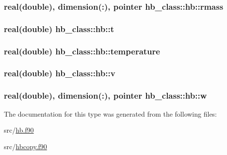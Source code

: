 \hypertarget{structhb__class_1_1hb_adc2ac99589f86766e4d80c7a2d8eaa0c}{
\subsubsection[{rmass}]{\setlength{\rightskip}{0pt plus 5cm}real(double), dimension(\+:), pointer hb\+\_\+class\+::hb\+::rmass\hspace{0.3cm}{\ttfamily [private]}}}\label{structhb__class_1_1hb_adc2ac99589f86766e4d80c7a2d8eaa0c}
\hypertarget{structhb__class_1_1hb_aa9a64f5f6e1c6b43e49f4f369cc36122}{
\subsubsection[{t}]{\setlength{\rightskip}{0pt plus 5cm}real(double) hb\+\_\+class\+::hb\+::t\hspace{0.3cm}{\ttfamily [private]}}}\label{structhb__class_1_1hb_aa9a64f5f6e1c6b43e49f4f369cc36122}
\hypertarget{structhb__class_1_1hb_a5d5e5ee121dffd96571df21b84b83507}{
\subsubsection[{temperature}]{\setlength{\rightskip}{0pt plus 5cm}real(double) hb\+\_\+class\+::hb\+::temperature\hspace{0.3cm}{\ttfamily [private]}}}\label{structhb__class_1_1hb_a5d5e5ee121dffd96571df21b84b83507}
\hypertarget{structhb__class_1_1hb_ac20e5692850cd29066ed51b1f51b65ab}{
\subsubsection[{v}]{\setlength{\rightskip}{0pt plus 5cm}real(double) hb\+\_\+class\+::hb\+::v\hspace{0.3cm}{\ttfamily [private]}}}\label{structhb__class_1_1hb_ac20e5692850cd29066ed51b1f51b65ab}
\hypertarget{structhb__class_1_1hb_aa5b032073db26bbc82430e5dcefa77a6}{
\subsubsection[{w}]{\setlength{\rightskip}{0pt plus 5cm}real(double), dimension(\+:), pointer hb\+\_\+class\+::hb\+::w\hspace{0.3cm}{\ttfamily [private]}}}\label{structhb__class_1_1hb_aa5b032073db26bbc82430e5dcefa77a6}


The documentation for this type was generated from the following files\+:\begin{DoxyCompactItemize}
\item 
src/\hyperlink{hb_8f90}{hb.\+f90}\item 
src/\hyperlink{hbcopy_8f90}{hbcopy.\+f90}\end{DoxyCompactItemize}
